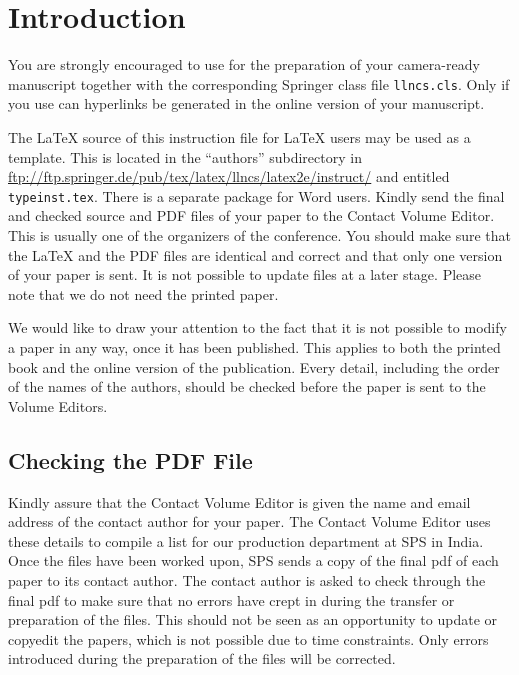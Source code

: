 \documentclass{book}
\newcommand{\keywords}[1]{\par\addvspace\baselineskip
\noindent\keywordname\enspace\ignorespaces#1}
\begin{document}
\begin{abstract}
The abstract should summarize the contents of the paper and should
contain at least 70 and at most 150 words. It should be written using the
\emph{abstract} environment.
\keywords{We would like to encourage you to list your keywords within
the abstract section}
\end{abstract}


\section{Introduction}

You are strongly encouraged to use \LaTeXe{} for the
preparation of your camera-ready manuscript together with the
corresponding Springer class file \verb+llncs.cls+. Only if you use
\LaTeXe{} can hyperlinks be generated in the online version
of your manuscript.

The \LaTeX{} source of this instruction file for \LaTeX{} users may be
used as a template. This is
located in the ``authors'' subdirectory in
\url{ftp://ftp.springer.de/pub/tex/latex/llncs/latex2e/instruct/} and
entitled \texttt{typeinst.tex}. There is a separate package for Word 
users. Kindly send the final and checked source
and PDF files of your paper to the Contact Volume Editor. This is
usually one of the organizers of the conference. You should make sure
that the \LaTeX{} and the PDF files are identical and correct and that
only one version of your paper is sent. It is not possible to update
files at a later stage. Please note that we do not need the printed
paper.

We would like to draw your attention to the fact that it is not possible
to modify a paper in any way, once it has been published. This applies
to both the printed book and the online version of the publication.
Every detail, including the order of the names of the authors, should
be checked before the paper is sent to the Volume Editors.

\subsection{Checking the PDF File}

Kindly assure that the Contact Volume Editor is given the name and email
address of the contact author for your paper. The Contact Volume Editor
uses these details to compile a list for our production department at
SPS in India. Once the files have been worked upon, SPS sends a copy of
the final pdf of each paper to its contact author. The contact author is
asked to check through the final pdf to make sure that no errors have
crept in during the transfer or preparation of the files. This should
not be seen as an opportunity to update or copyedit the papers, which is
not possible due to time constraints. Only errors introduced during the
preparation of the files will be corrected.
\end{document}
